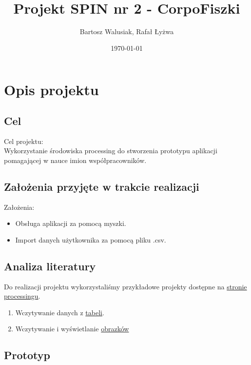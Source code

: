 \documentclass[11pt]{article}
\begin{document}
    \title{Projekt SPIN nr 2 - CorpoFiszki}
    \author{Bartosz Walusiak, Rafał Łyżwa}
    \date{\today}
    \maketitle

    \tableofcontents

    \newpage

    \section{Opis projektu}\label{sec:description}
    \subsection{Cel}\label{subsec:target}
    Cel projektu:\\
    Wykorzystanie środowiska processing do stworzenia prototypu aplikacji pomagającej w nauce imion współpracowników.

    \subsection{Założenia przyjęte w trakcie realizacji}\label{subsec:design-choices}
    Założenia:
    \begin{itemize}
        \item Obsługa aplikacji za pomocą myszki.
        \item Import danych użytkownika za pomocą pliku .csv.
    \end{itemize}

    \subsection{Analiza literatury}\label{subsec:research}

    Do realizacji projektu wykorzystaliśmy przykładowe projekty dostępne na \href{https://processing.org/examples/}{stronie processingu}.
    \begin{enumerate}
        \item Wczytywanie danych z \href{https://processing.org/examples/loadsavetable.html}{tabeli}.
        \item Wczytywanie i wyświetlanie \href{https://processing.org/examples/loaddisplayimage.html}{obrazków}
    \end{enumerate}

    \subsection{Prototyp}\label{subsec:prototype}
\end{document}

